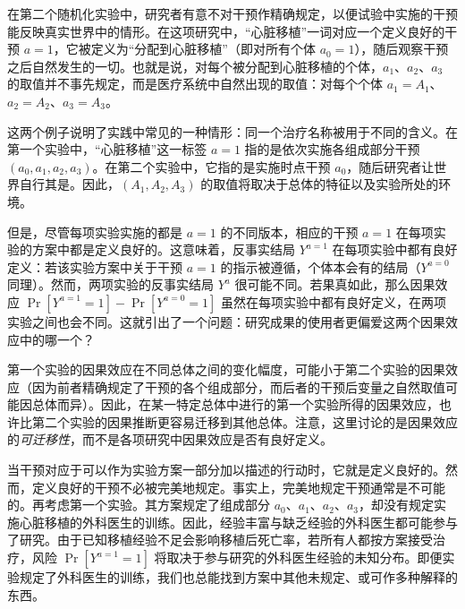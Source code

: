 在第二个随机化实验中，研究者有意不对干预作精确规定，以便试验中实施的干预能反映真实世界中的情形。在这项研究中，“心脏移植”一词对应一个定义良好的干预 $a=1$，它被定义为“分配到心脏移植”（即对所有个体 $a_0=1$），随后观察干预之后自然发生的一切。也就是说，对每个被分配到心脏移植的个体，$a_1$、$a_2$、$a_3$ 的取值并不事先规定，而是医疗系统中自然出现的取值：对每个个体 $a_1=A_1$、$a_2=A_2$、$a_3=A_3$。


这两个例子说明了实践中常见的一种情形：同一个治疗名称被用于不同的含义。在第一个实验中，“心脏移植”这一标签 $a=1$ 指的是依次实施各组成部分干预 $(a_0,a_1,a_2,a_3)$。在第二个实验中，它指的是实施时点干预 $a_0$，随后研究者让世界自行其是。因此，$(A_1,A_2,A_3)$ 的取值将取决于总体的特征以及实验所处的环境。

但是，尽管每项实验实施的都是 $a=1$ 的不同版本，相应的干预 $a=1$ 在每项实验的方案中都是定义良好的。这意味着，反事实结局 $Y^{a=1}$ 在每项实验中都有良好定义：若该实验方案中关于干预 $a=1$ 的指示被遵循，个体本会有的结局（$Y^{a=0}$ 同理）。然而，两项实验的反事实结局 $Y^{a}$ 很可能不同。若果真如此，那么因果效应 $\Pr[Y^{a=1}=1]-\Pr[Y^{a=0}=1]$ 虽然在每项实验中都有良好定义，在两项实验之间也会不同。这就引出了一个问题：研究成果的使用者更偏爱这两个因果效应中的哪一个？

第一个实验的因果效应在不同总体之间的变化幅度，可能小于第二个实验的因果效应（因为前者精确规定了干预的各个组成部分，而后者的干预后变量之自然取值可能因总体而异）。因此，在某一特定总体中进行的第一个实验所得的因果效应，也许比第二个实验的因果推断更容易迁移到其他总体。注意，这里讨论的是因果效应的\emph{可迁移性}，而不是各项研究中因果效应是否有良好定义。


当干预对应于可以作为实验方案一部分加以描述的行动时，它就是定义良好的。然而，定义良好的干预不必被完美地规定。事实上，完美地规定干预通常是不可能的。再考虑第一个实验。其方案规定了组成部分 $a_0$、$a_1$、$a_2$、$a_3$，却没有规定实施心脏移植的外科医生的训练。因此，经验丰富与缺乏经验的外科医生都可能参与了研究。由于已知移植经验不足会影响移植后死亡率，若所有人都按方案接受治疗，风险 $\Pr[Y^{a=1}=1]$ 将取决于参与研究的外科医生经验的未知分布。即便实验规定了外科医生的训练，我们也总能找到方案中其他未规定、或可作多种解释的东西。

